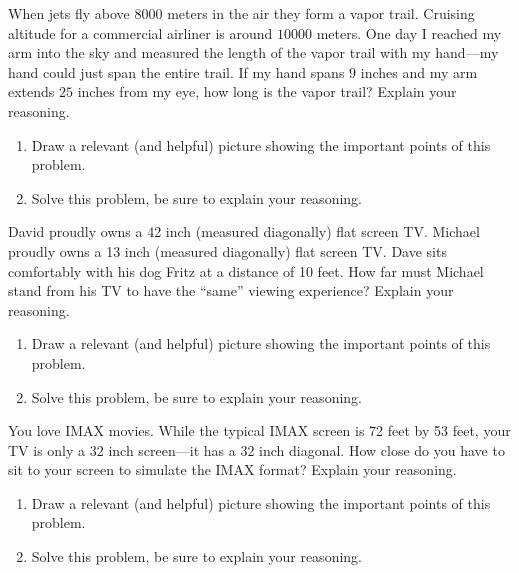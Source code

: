 \documentclass[nooutcomes]{ximera}
\begin{document}
\begin{question}
When jets fly above $8000$ meters in the air they form a vapor
  trail. Cruising altitude for a commercial airliner is around $10000$
  meters. One day I reached my arm into the sky and measured the
  length of the vapor trail with my hand---my hand could just span the
  entire trail. If my hand spans $9$ inches and my arm extends $25$
  inches from my eye, how long is the vapor trail? Explain your
  reasoning.
\begin{enumerate}
\item Draw a relevant (and helpful) picture showing the important
  points of this problem.
\item Solve this problem, be sure to explain your reasoning.
\end{enumerate}

\begin{freeResponse}
\begin{hint}
\end{hint}
\end{freeResponse}
\end{question}

\begin{question}
David proudly owns a 42 inch (measured diagonally) flat screen
  TV. Michael proudly owns a 13 inch (measured diagonally) flat screen
  TV. Dave sits comfortably with his dog Fritz at a distance of 10
  feet. How far must Michael stand from his TV to have the ``same''
  viewing experience?  Explain your reasoning.
\begin{enumerate}
\item Draw a relevant (and helpful) picture showing the important
  points of this problem.
\item Solve this problem, be sure to explain your reasoning.
\end{enumerate}

\begin{freeResponse}
\begin{hint}
\end{hint}
\end{freeResponse}
\end{question}

\begin{question}
You love IMAX movies. While the typical IMAX screen is 72 feet
  by 53 feet, your TV is only a 32 inch screen---it has a 32 inch
  diagonal. How close do you have to sit to your screen to simulate
  the IMAX format? Explain your reasoning.
\begin{enumerate}
\item Draw a relevant (and helpful) picture showing the important
  points of this problem.
\item Solve this problem, be sure to explain your reasoning.
\end{enumerate}

\begin{freeResponse}
\begin{hint}
\end{hint}
\end{freeResponse}
\end{question}
\end{document}
